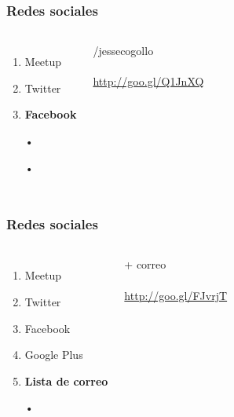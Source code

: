 \documentclass{beamer}
\begin{document}
\begin{frame}
\frametitle{Redes sociales}
\begin{columns}[c] %

\begin{enumerate}
\item Meetup
\item Twitter
\item \textbf{Facebook}
\item[•]	
\item[•]	
\end{enumerate}

{\color{blue}/jessecogollo}
\\~\\
{\color{blue}\url{http://goo.gl/Q1JnXQ}}
\end{columns}
\end{frame}
\begin{frame}
\frametitle{Redes sociales}
\begin{columns}[c] %

\begin{enumerate}
\item Meetup
\item Twitter
\item Facebook
\item Google Plus
\item \textbf{Lista de correo}
\item[•]	
\end{enumerate}

{\color{blue}+ correo}
\\~\\
{\color{blue}\url{http://goo.gl/FJvrjT}}
\end{columns}
\end{frame}
\end{document}
